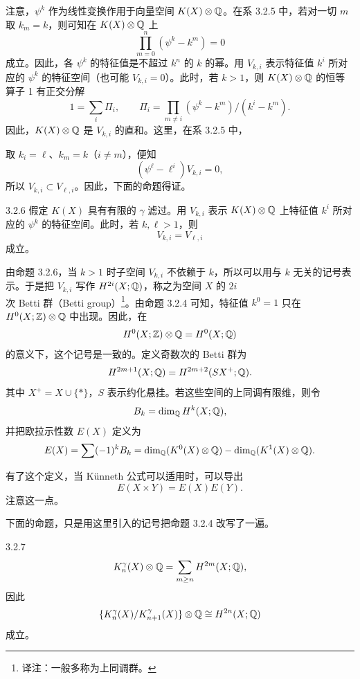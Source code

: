 注意，$\psi^k$ 作为线性变换作用于向量空间 $K(X)\otimes\mathbb{Q}$。在系 3.2.5 中，若对一切 $m$ 取 $k_m=k$，则可知在 $K(X)\otimes\mathbb{Q}$ 上
\[
\prod_{m=0}^{n}(\psi^k-k^m)=0
\]
成立。因此，各 $\psi^k$ 的特征值是不超过 $k^n$ 的 $k$ 的幂。用 $V_{k,i}$ 表示特征值 $k^i$ 所对应的 $\psi^k$ 的特征空间（也可能 $V_{k,i}=0$）。此时，若 $k>1$，则 $K(X)\otimes\mathbb{Q}$ 的恒等算子 1 有正交分解
\[
1=\sum_i\Pi_i,\qquad
\Pi_i=\prod_{m\ne i}(\psi^k-k^m)/(k^i-k^m).
\]
因此，$K(X)\otimes\mathbb{Q}$ 是 $V_{k,i}$ 的直和。这里，在系 3.2.5 中，

取 $k_i=\ell$、$k_m=k$（$i\ne m$），便知
\[
(\psi^\ell-\ell^i)V_{k,i}=0,
\]
所以 $V_{k,i}\subset V_{\ell,i}$。因此，下面的命题得证。

\begin{proposition*}{3.2.6}
假定 $K(X)$ 具有有限的 $\gamma$ 滤过。用 $V_{k,i}$ 表示 $K(X)\otimes\mathbb{Q}$ 上特征值 $k^i$ 所对应的 $\psi^k$ 的特征空间。此时，若 $k,\ell>1$，则
\[
V_{k,i}=V_{\ell,i}
\]
成立。
\end{proposition*}

由命题 3.2.6，当 $k>1$ 时子空间 $V_{k,i}$ 不依赖于 $k$，所以可以用与 $k$ 无关的记号表示。于是把 $V_{k,i}$ 写作 $H^{2i}(X;\mathbb{Q})$，称之为空间 $X$ 的 $2i$ 次 Betti 群（Betti group）\footnote{译注：一般多称为上同调群。}。由命题 3.2.4 可知，特征值 $k^0=1$ 只在 $H^0(X;\mathbb{Z})\otimes\mathbb{Q}$ 中出现。因此，在
\[
H^0(X;\mathbb{Z})\otimes\mathbb{Q}=H^0(X;\mathbb{Q})
\]
的意义下，这个记号是一致的。定义奇数次的 Betti 群为
\[
H^{2m+1}(X;\mathbb{Q})=H^{2m+2}(SX^+;\mathbb{Q}).
\]
其中 $X^+=X\cup\{*\}$，$S$ 表示约化悬挂。若这些空间的上同调有限维，则令
\[
B_k=\dim_{\mathbb{Q}} H^k(X;\mathbb{Q}),
\]
并把欧拉示性数 $E(X)$ 定义为
\[
E(X)=\sum(-1)^kB_k=\dim_{\mathbb{Q}}(K^0(X)\otimes\mathbb{Q})-\dim_{\mathbb{Q}}(K^1(X)\otimes\mathbb{Q}).
\]


有了这个定义，当 Künneth 公式可以适用时，可以导出
\[
E(X\times Y)=E(X)E(Y).
\]
注意这一点。

下面的命题，只是用这里引入的记号把命题 3.2.4 改写了一遍。

\begin{proposition*}{3.2.7}
\[
K_n^\gamma(X)\otimes\mathbb{Q}=\sum_{m\ge n}H^{2m}(X;\mathbb{Q}),
\]
因此
\[
\{K_n^\gamma(X)/K_{n+1}^\gamma(X)\}\otimes\mathbb{Q}\cong H^{2n}(X;\mathbb{Q})
\]
成立。
\end{proposition*}


